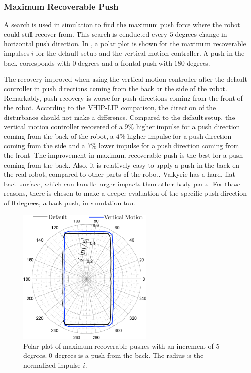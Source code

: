 \subsubsection{Maximum Recoverable Push} 
A search is used in simulation to find the maximum push force where the robot could still recover from. This search is conducted every $5$ degrees change in horizontal push direction.  In , a polar plot is shown for the maximum recoverable impulses $i$ for the default setup and the vertical motion controller. A push in the back corresponds with $0$ degrees and a frontal push with $180$ degrees.

The recovery improved when using the vertical motion controller after the default controller in push directions coming from the back or the side of the robot. Remarkably, push recovery is worse for push directions coming from the front of the robot. According to the \ac{VHIP}-\ac{LIP} comparison, the direction of the disturbance should not make a difference. Compared to the default setup, the vertical motion controller recovered of a $9$\% higher impulse for a push direction coming from the back of the robot, a $4$\% higher impulse for a push direction coming from the side and a $7$\% lower impulse for a push direction coming from the front. The improvement in maximum recoverable push is the best for a push coming from the back. Also, it is relatively easy to apply a push in the back on the real robot, compared to other parts of the robot. Valkyrie has a hard, flat back surface, which can handle larger impacts than other body parts. For those reasons, there is chosen to make a deeper evaluation of the specific push direction of $0$ degrees, a back push, in simulation too.
\begin{figure}
\centering
\includegraphics[width=0.6\textwidth]{STYLESTUFF/roundStanding.png}
\caption{Polar plot of maximum recoverable pushes with an increment of $5$ degrees. $0$ degrees is a push from the back. The radius is the normalized impulse $i$. }
\label{fig:roundStanding}
\end{figure}

